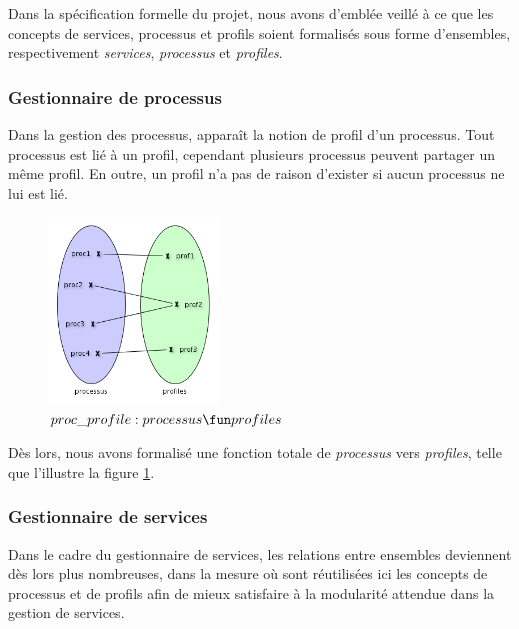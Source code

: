 \documentclass[french, titlepage, 10pt, a4paper]{article}
\begin{document}
Dans la spécification formelle du projet, nous avons d'emblée veillé à ce que
les concepts de services, processus et profils soient formalisés sous forme
d'ensembles, respectivement \emph{services}, \emph{processus} et
\emph{profiles}.

\subsubsection{Gestionnaire de processus}

Dans la gestion des processus, apparaît la notion de profil d'un processus.
Tout processus est lié à un profil, cependant plusieurs processus peuvent
partager un même profil.
En outre, un profil n'a pas de raison d'exister si aucun processus ne lui est
lié.

\begin{figure}[htb]
  \centering
  \includegraphics[width=0.4\textwidth]{proc_profile.png}
  \caption{$proc\_profile: processus \fun profiles$}
  \label{fig:proc_profile}
\end{figure}

Dès lors, nous avons formalisé une fonction totale de \emph{processus} vers
\emph{profiles}, telle que l'illustre la figure \ref{fig:proc_profile}.

\subsubsection{Gestionnaire de services}

Dans le cadre du gestionnaire de services, les relations entre ensembles
deviennent dès lors plus nombreuses, dans la mesure où sont réutilisées ici les
concepts de processus et de profils afin de mieux satisfaire à la modularité
attendue dans la gestion de services.
\end{document}
